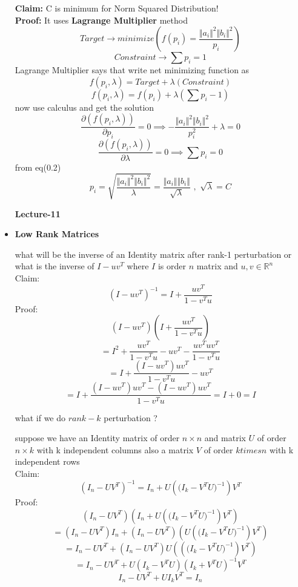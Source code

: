 \documentclass[a4paper]{article}
\numberwithin{equation}{section}
\begin{document}
\begin{itemize}
\textbf{Claim: }C is minimum for Norm Squared Distribution!\\
\textbf{Proof: }It uses \textbf{Lagrange Multiplier} method
\[Target \rightarrow minimize\left(f(p_i)=\frac{\Vert a_i\Vert^2 \Vert b_i\Vert^2}{p_i}\right)\]
\[Constraint \rightarrow \sum p_i=1\]
Lagrange Multiplier says that write net minimizing function as 
\[f(p_i,\lambda)=Target+\lambda(Constraint)\]
\[f(p_i,\lambda)=f(p_i)+\lambda\left(\sum p_i-1\right)\]
now use calculus and get the solution
\begin{equation}
    \frac{\partial\left(f(p_i,\lambda)\right)}{\partial p_i}=0 \implies -\frac{\Vert a_i\Vert^2 \Vert b_i\Vert^2}{p_i^2}+\lambda=0
\end{equation}
\begin{equation}
    \frac{\partial\left(f(p_i,\lambda)\right)}{\partial \lambda}=0 \implies \sum p_i=0
\end{equation}
from eq(0.2)
\[p_i=\sqrt{\frac{\Vert a_i\Vert^2 \Vert b_i\Vert^2}{\lambda}}=\frac{\Vert a_i\Vert \Vert b_i\Vert}{\sqrt{\lambda}} \hspace{4pt},\hspace{4pt}\sqrt{\lambda}=C\]

\begin{center}
    \textbf{\Huge{Lecture-11}}
\end{center}
\vspace{5pt}
\item \textbf{Low Rank Matrices}

what will be the inverse of an Identity matrix after rank-1 perturbation or what is the inverse of $I-uv^T$ where $I$ is order $n$ matrix and $u,v\in \mathbb{R}^n$\\

Claim:
\[ \boxed{(I-uv^T)^{-1}=I+\frac{uv^T}{1-v^Tu}}\]
Proof:
\[ \left(I-uv^T\right)\left(I+\frac{uv^T}{1-v^Tu}\right)\]
\[=I^2+\frac{uv^T}{1-v^Tu}-uv^T-\frac{uv^Tuv^T}{1-v^Tu}\]
\[=I+\frac{(I-uv^T)uv^T}{1-v^Tu}-uv^T\]
\[=I+\frac{(I-uv^T)uv^T-(I-uv^T)uv^T}{1-v^Tu}=I+0=I\]

what if we do $rank-k$ perturbation ?

suppose we have an Identity matrix of order $n\times n$ and matrix $U$ of order $n\times k$ with k independent columns also a matrix $V$ of order $ktimes n$ with k independent rows \\

Claim:
\[ \boxed{(I_n-UV^T)^{-1}=I_n+{U\left({(I_k-V^TU})^{-1}\right)V^T}}\]
Proof:
\[(I_n-UV^T)\left(I_n+{U\left({(I_k-V^TU})^{-1}\right)V^T}\right)\]
\[=(I_n-UV^T)I_n+(I_n-UV^T)\left({U\left({(I_k-V^TU})^{-1}\right)V^T}\right)\]
\[=I_n-UV^T+(I_n-UV^T)U\left({\left({(I_k-V^TU})^{-1}\right)V^T}\right)\]
\[=I_n-UV^T+U(I_k-V^TU)\left(I_k+V^TU\right)^{-1}V^T\]
\[I_n-UV^T+UI_kV^T=I_n\]


\end{itemize}
\end{document}
